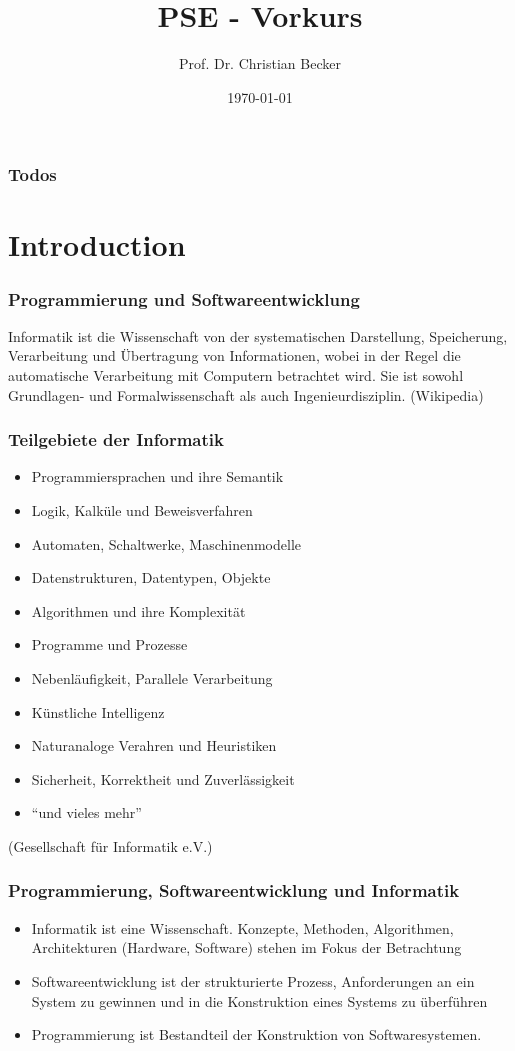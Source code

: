 \documentclass{../../presentation}
\title{PSE - Vorkurs}
\author{Prof. Dr. Christian Becker}
\institute{Universität Stuttgart, Institut für Parallele und Verteilte Systeme}
\date{\today}
\begin{document}
\begin{frame}
  \titlepage
\end{frame}

\begin{frame}
  \frametitle{Todos}
  \listoftodos{}
\end{frame}

\section{Introduction}

\begin{frame}[fragile]
  \frametitle{Programmierung und Softwareentwicklung}

  Informatik ist die Wissenschaft von der systematischen Darstellung, Speicherung, Verarbeitung und Übertragung von Informationen, wobei in der Regel die automatische Verarbeitung mit Computern betrachtet wird. Sie ist sowohl Grundlagen- und Formalwissenschaft als auch Ingenieurdisziplin. (Wikipedia)
\end{frame}

\begin{frame}[fragile]
  \frametitle{Teilgebiete der Informatik}

  \begin{itemize}
    \item Programmiersprachen und ihre Semantik
    \item Logik, Kalküle und Beweisverfahren
    \item Automaten, Schaltwerke, Maschinenmodelle
    \item Datenstrukturen, Datentypen, Objekte
    \item Algorithmen und ihre Komplexität
    \item Programme und Prozesse
    \item Nebenläufigkeit, Parallele Verarbeitung
    \item Künstliche Intelligenz
    \item Naturanaloge Verahren und Heuristiken
    \item Sicherheit, Korrektheit und Zuverlässigkeit
    \item \enquote{und vieles mehr}
  \end{itemize}
  (Gesellschaft für Informatik e.V.)
\end{frame}

\begin{frame}[fragile]
  \frametitle{Programmierung, Softwareentwicklung und Informatik}

  \begin{itemize}
    \item Informatik ist eine Wissenschaft. Konzepte, Methoden, Algorithmen, Architekturen (Hardware, Software) stehen im Fokus der Betrachtung
    \item Softwareentwicklung ist der strukturierte Prozess, Anforderungen an ein System zu gewinnen und in die Konstruktion eines Systems zu überführen
    \item Programmierung ist Bestandteil der Konstruktion von Softwaresystemen.
  \end{itemize}
\end{frame}
\end{document}
